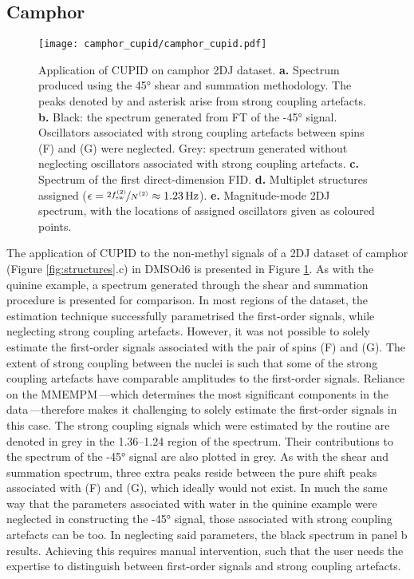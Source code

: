 \subsection{Camphor}
\begin{figure}%
    \centering%
    \texttt{[image: camphor\_cupid/camphor\_cupid.pdf]}%
    \caption[
        Application of \acs{CUPID} on a camphor dataset.
    ]{
        Application of \acs{CUPID} on camphor \ac{2DJ} dataset.
        \textbf{a.} Spectrum produced using the \ang{45} shear and summation
        methodology. The peaks denoted by and asterisk arise from strong
        coupling artefacts.
        \textbf{b.} Black: the spectrum generated from \ac{FT} of the \ang{-45}
        signal. Oscillators associated with strong coupling artefacts between
        spins (F) and (G) were neglected. Grey: spectrum generated without
        neglecting oscillators associated with strong coupling artefacts.
        \textbf{c.} Spectrum of the first direct-dimension \ac{FID}.
        \textbf{d.} Multiplet structures assigned ($\epsilon =
        \nicefrac{2 \fswtwo}{\Ntwo} \approx \qty{1.23}{\hertz}$).
        \textbf{e.} Magnitude-mode \acs{2DJ} spectrum, with the locations of
        assigned oscillators given as coloured points.
    }
    \label{fig:camphor-cupid}%
\end{figure}%
The application of \ac{CUPID} to the non-methyl signals of a \ac{2DJ}
dataset of camphor (Figure \ref{fig:structures}.c) in \acs{DMSOd6} is presented
in Figure \ref{fig:camphor-cupid}. As with the quinine example, a spectrum
generated through the shear and summation procedure is presented for
comparison. In most regions of the dataset, the estimation technique
successfully parametrised the first-order signals, while neglecting strong
coupling artefacts. However, it was not possible to solely estimate the
first-order signals associated with the pair of spins (F) and (G). The extent
of strong coupling between the nuclei is such that some of the strong coupling
artefacts have comparable amplitudes to the first-order signals. Reliance on
the
\ac{MMEMPM}\,---which determines the most significant components in
the data\,---therefore makes it challenging to solely estimate the first-order
signals in this case. The strong coupling signals which were estimated by the
routine are denoted in grey in the \SIrange{1.36}{1.24}{\partspermillion} region
of the spectrum. Their contributions to the spectrum of the \ang{-45} signal
are also plotted in grey. As with the shear and summation spectrum, three extra
peaks reside between the pure shift peaks associated with (F) and (G), which
ideally would not exist. In much the same way that the parameters associated
with water in the quinine example were neglected in constructing the \ang{-45}
signal, those associated with strong coupling artefacts can be too.
In neglecting said parameters, the black spectrum in panel b
results. Achieving this requires manual intervention, such that the user needs
the expertise to distinguish between first-order signals and strong coupling
artefacts.

